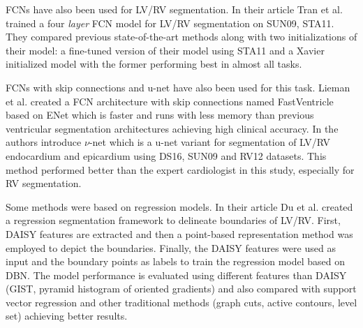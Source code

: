\documentclass[journal]{IEEEtran}
\begin{document}
FCNs have also been used for LV/RV segmentation.
In their article Tran et al.\cite{tran2016fully} trained a four \textit{layer} FCN model for LV/RV segmentation on SUN09, STA11.
They compared previous state-of-the-art methods along with two initializations of their model: a fine-tuned version of their model using STA11 and a Xavier initialized model with the former performing best in almost all tasks.

FCNs with skip connections and u-net have also been used for this task.
Lieman et al.\cite{lieman2017fastventricle} created a FCN architecture with skip connections named FastVentricle based on ENet\cite{paszke2016enet} which is faster and runs with less memory than previous ventricular segmentation architectures achieving high clinical accuracy.
In\cite{winther2017nu} the authors introduce $\nu$-net which is a u-net variant for segmentation of LV/RV endocardium and epicardium using DS16, SUN09 and RV12 datasets.
This method performed better than the expert cardiologist in this study, especially for RV segmentation.

Some methods were based on regression models.
In their article Du et al.\cite{du2018deep} created a regression segmentation framework to delineate boundaries of LV/RV\@.
First, DAISY features are extracted and then a point-based representation method was employed to depict the boundaries.
Finally, the DAISY features were used as input and the boundary points as labels to train the regression model based on DBN\@.
The model performance is evaluated using different features than DAISY (GIST, pyramid histogram of oriented gradients) and also compared with support vector regression and other traditional methods (graph cuts, active contours, level set) achieving better results.
\end{document}
